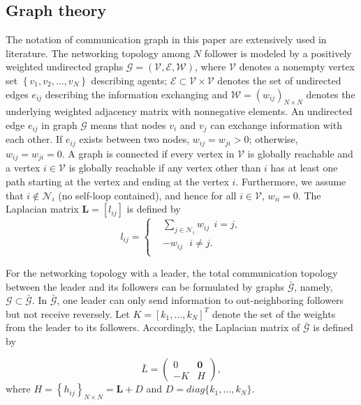 \documentclass[review]{elsarticle}
\begin{document}
\subsection{Graph theory}\label{GT}
The notation of communication graph in this paper are extensively used in literature. 
The networking topology among $N$ follower is modeled by a positively weighted undirected graphs $\mathcal{G}=(\mathcal{V},\mathcal{E},\mathcal{W})$, where $\mathcal{V}$ denotes a nonempty vertex set $\left\lbrace v_1,v_2,\ldots,v_N \right\rbrace $ describing agents; $\mathcal{E} \subset \mathcal{V} \times \mathcal{V}$ denotes the set of undirected edges $e_{ij}$ describing the information exchanging and $\mathcal{W}= ({w}_{ij})_{N\times N}$ denotes the underlying weighted adjacency matrix with nonnegative elements. 
An undirected edge $e_{ij}$ in graph $\mathcal{G}$ means that nodes $v_i$ and $v_j$ can exchange information with each other. If $e_{ij}$ exists between two nodes, $w_{ij} = w_{ji}>0$; otherwise, $w_{ij} = w_{ji}=0$. 
A graph is connected if every vertex in $\mathcal{V}$ is globally reachable and a vertex $i \in \mathcal{V} $ is globally reachable if any vertex other than $i$ has at least one path starting at the vertex and ending at the vertex $i$.
Furthermore, we assume that $i \not\in \mathcal{N}_i$ (no self-loop contained), and hence for all $i \in \mathcal{V}$, $w_{ii}=0$. The Laplacian matrix $\textbf{L}=[l_{ij}]$ is defined by
\begin{equation*}
l_{ij} = \left\{\begin{aligned}
&  \sum_{j\in \mathcal{N}_i}w_{ij}~~i=j,\\
&  -w_{ij}~~~i\neq j.\\
\end{aligned}\right.
\end{equation*}

For the networking topology with a leader, the total communication topology between the leader and its followers can be formulated by graphs $\bar{\mathcal{G}}$, namely, $\mathcal{G} \subset \bar{\mathcal{G}}$. In $\bar{\mathcal{G}}$, one leader can only send information to out-neighboring followers but not receive reversely. Let $K=[k_1,\ldots,k_N]^T$ denote the set of the weights from the leader to its followers. Accordingly, the Laplacian matrix of $\bar{\mathcal{G}}$ is defined by 

\begin{equation*} 
\bar L =\begin{pmatrix}
0&\textbf{0}\\
-K& H
\end{pmatrix},
\end{equation*}
where $H=\left\lbrace h_{ij}\right\rbrace_{N\times N} = \textbf{L}+D$ and $D=diag\{k_1,\ldots,k_N\}$.
\end{document}

